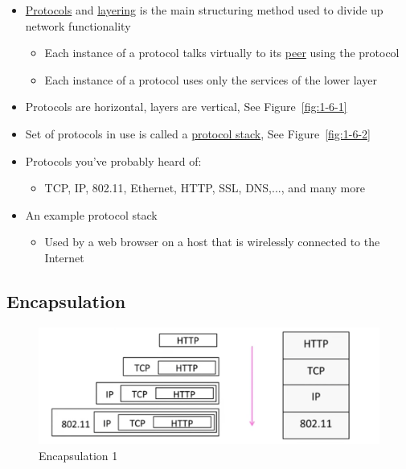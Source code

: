 \documentclass[12pt]{ctexart}   %
\begin{document}
	\begin{itemize}
		\item \underline{Protocols} and \underline{layering} is the main structuring method used to divide up network functionality
		\begin{itemize}
			\item Each instance of a protocol talks virtually to its \underline{peer} using the protocol
			\item Each instance of a protocol uses only the services of the lower layer
		\end{itemize}
		
		\item Protocols are horizontal, layers are vertical, See Figure~\ref{fig:1-6-1}
		\item Set of protocols in use is called a \underline{protocol stack}, See Figure~\ref{fig:1-6-2}
		
		\item Protocols you've probably heard of:
		\begin{itemize}
			\item TCP, IP, 802.11, Ethernet, HTTP, SSL, DNS,..., and many more
		\end{itemize}
		
		\item An example protocol stack
		\begin{itemize}
			\item Used by a web browser on a host that is wirelessly connected to the Internet
		\end{itemize}
	\end{itemize}
	
	\subsection{Encapsulation}
	
	\begin{figure}[h!] %
	 \centering
	 \includegraphics[scale=0.7]{images/1-6-3}
	\caption{ Encapsulation 1 }
	 \label{fig:1-6-3}
	 \end{figure}
	 
\end{document}
